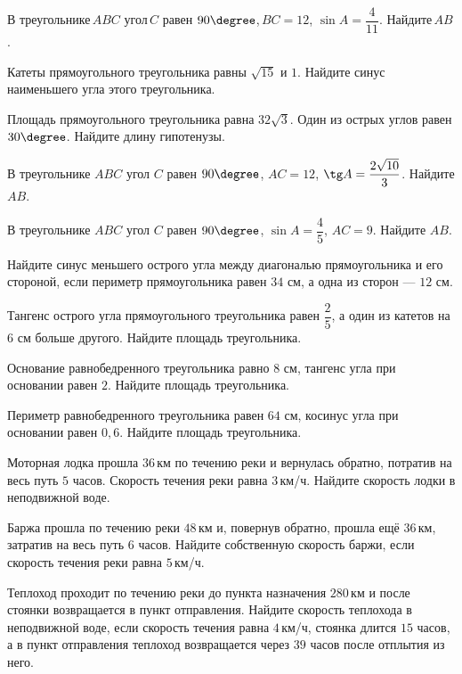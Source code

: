 \begin{class}[number=1]
\begin{listofex}
		\item В треугольнике \( ABC \) угол \( C \) равен \( 90\degree \), \( BC=12 \), \( \sin A=\dfrac{4}{11} \). Найдите \( AB \).
		\item Катеты прямоугольного треугольника равны \( \sqrt{15} \) и \( 1 \). Найдите синус наименьшего угла этого треугольника.
		\item Площадь прямоугольного треугольника равна \( 32\sqrt{3} \). Один из острых углов равен \( 30\degree \). Найдите длину гипотенузы.
		\item В треугольнике \( ABC \) угол \( C \) равен \( 90\degree \), \( AC=12 \), \( \tg A=\dfrac{2\sqrt{10}}{3} \).  Найдите \( AB \).
		\item В треугольнике \( ABC \) угол \( C \) равен \( 90\degree \), \( \sin A=\dfrac{4}{5} \), \( AC=9 \). Найдите \( AB \).
		\item Найдите синус меньшего острого угла между	диагональю прямоугольника и его стороной, если периметр прямоугольника равен \( 34 \) см, а одна из сторон --- \( 12 \) см. 
		\item Тангенс острого угла прямоугольного треугольника равен \( \dfrac{2}{5} \), а один из катетов на \( 6 \) см больше другого. Найдите площадь треугольника. 
		\item Основание равнобедренного треугольника равно \( 8 \) см, тангенс угла при основании равен \( 2 \). Найдите площадь треугольника. 
		\item Периметр равнобедренного треугольника равен \( 64 \) см, косинус угла при основании равен \( 0,6 \). Найдите площадь треугольника.
		\item Моторная лодка прошла \( 36 \) км по течению реки и вернулась обратно, потратив на весь путь \( 5 \) часов. Скорость течения реки равна \( 3 \) км/ч. Найдите скорость лодки в неподвижной воде.
		\item Баржа прошла по течению реки \( 48 \) км и, повернув обратно, прошла ещё \( 36 \) км, затратив на весь путь \( 6 \) часов. Найдите собственную скорость баржи, если скорость течения реки равна \( 5 \) км/ч.
		\item Теплоход проходит по течению реки до пункта назначения \( 280 \) км и после стоянки возвращается в пункт отправления. Найдите скорость теплохода в неподвижной воде, если скорость течения равна \( 4 \) км/ч, стоянка длится \( 15 \) часов, а в пункт отправления теплоход возвращается через \( 39 \) часов после отплытия из него.
	\end{listofex}
\end{class}

